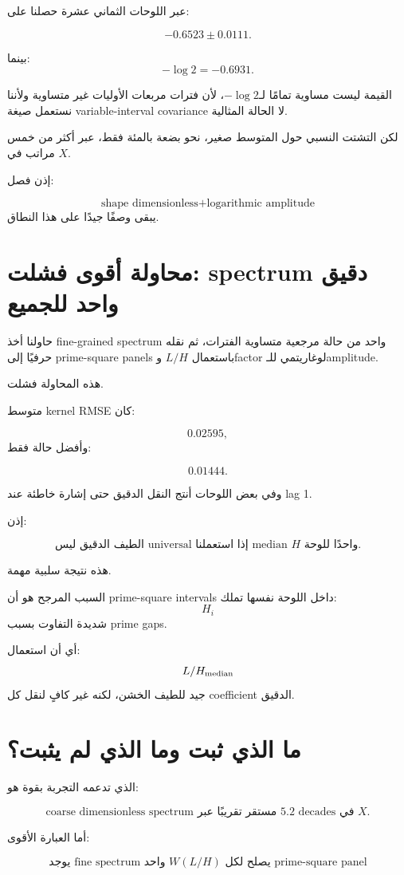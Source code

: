 \documentclass[12pt]{article}
\begin{document}
عبر اللوحات الثماني عشرة حصلنا على:

\[
\boxed{
-0.6523\pm0.0111.
}
\]

بينما:
\[
-\log2=-0.6931.
\]

القيمة ليست مساوية تمامًا لـ\(-\log2\)، لأن فترات مربعات الأوليات غير
متساوية ولأننا نستعمل صيغة variable-interval covariance لا الحالة المثالية.

لكن التشتت النسبي حول المتوسط صغير، نحو بضعة بالمئة فقط، عبر أكثر من خمس
مراتب في \(X\).

إذن فصل:

\[
\boxed{
\text{shape dimensionless}
+
\text{logarithmic amplitude}
}
\]
يبقى وصفًا جيدًا على هذا النطاق.

\section{محاولة أقوى فشلت: spectrum دقيق واحد للجميع}

حاولنا أخذ fine-grained spectrum واحد من حالة مرجعية متساوية الفترات،
ثم نقله حرفيًا إلى prime-square panels باستعمال \(L/H\) وfactor لوغاريتمي
للـamplitude.

هذه المحاولة فشلت.

متوسط kernel RMSE كان:

\[
0.02595,
\]
وأفضل حالة فقط:

\[
0.01444.
\]

وفي بعض اللوحات أنتج النقل الدقيق حتى إشارة خاطئة عند lag 1.

إذن:

\[
\boxed{
\text{الطيف الدقيق ليس universal إذا استعملنا median }H\text{ واحدًا للوحة.}
}
\]

هذه نتيجة سلبية مهمة.

السبب المرجح هو أن prime-square intervals داخل اللوحة نفسها تملك:
\[
H_i
\]
شديدة التفاوت بسبب prime gaps.

أي أن استعمال:
\[
L/H_{\rm median}
\]
جيد للطيف الخشن، لكنه غير كافٍ لنقل كل coefficient الدقيق.

\section{ما الذي ثبت وما الذي لم يثبت؟}

الذي تدعمه التجربة بقوة هو:

\[
\boxed{
\text{coarse dimensionless spectrum مستقر تقريبًا عبر }5.2\text{ decades في }X.
}
\]

أما العبارة الأقوى:

\[
\text{يوجد fine spectrum واحد }W(L/H)\text{ يصلح لكل prime-square panel}
\]
\end{document}
